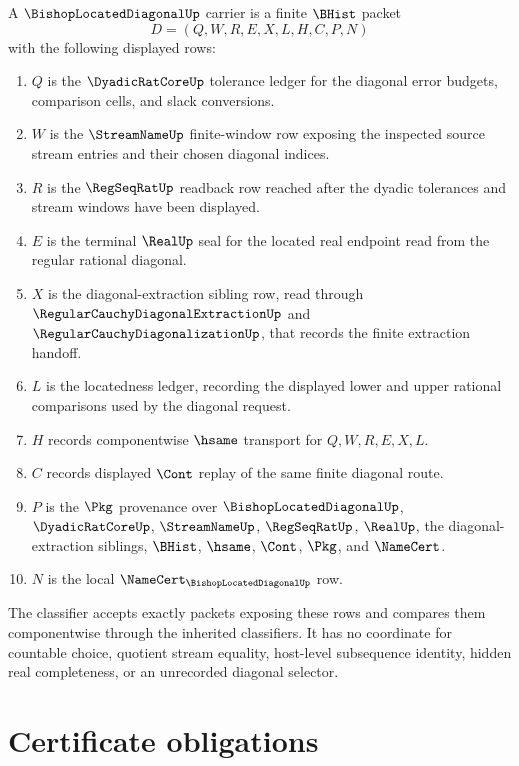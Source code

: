 \begin{definition}
\label{def:bishop-located-diagonal-carrier}
A $\BishopLocatedDiagonalUp$ carrier is a finite $\BHist$ packet
$$
D=(Q,W,R,E,X,L,H,C,P,N)
$$
with the following displayed rows:
\begin{enumerate}
\item $Q$ is the $\DyadicRatCoreUp$ tolerance ledger for the diagonal error budgets, comparison cells, and slack conversions.
\item $W$ is the $\StreamNameUp$ finite-window row exposing the inspected source stream entries and their chosen diagonal indices.
\item $R$ is the $\RegSeqRatUp$ readback row reached after the dyadic tolerances and stream windows have been displayed.
\item $E$ is the terminal $\RealUp$ seal for the located real endpoint read from the regular rational diagonal.
\item $X$ is the diagonal-extraction sibling row, read through $\RegularCauchyDiagonalExtractionUp$ and $\RegularCauchyDiagonalizationUp$, that records the finite extraction handoff.
\item $L$ is the locatedness ledger, recording the displayed lower and upper rational comparisons used by the diagonal request.
\item $H$ records componentwise $\hsame$ transport for $Q,W,R,E,X,L$.
\item $C$ records displayed $\Cont$ replay of the same finite diagonal route.
\item $P$ is the $\Pkg$ provenance over $\BishopLocatedDiagonalUp$, $\DyadicRatCoreUp$, $\StreamNameUp$, $\RegSeqRatUp$, $\RealUp$, the diagonal-extraction siblings, $\BHist$, $\hsame$, $\Cont$, $\Pkg$, and $\NameCert$.
\item $N$ is the local $\NameCert_{\BishopLocatedDiagonalUp}$ row.
\end{enumerate}
The classifier accepts exactly packets exposing these rows and compares them componentwise through the inherited classifiers. It has no coordinate for countable choice, quotient stream equality, host-level subsequence identity, hidden real completeness, or an unrecorded diagonal selector.
\end{definition}

\section{Certificate obligations}
\label{sec:bishop-located-diagonal-obligations}

